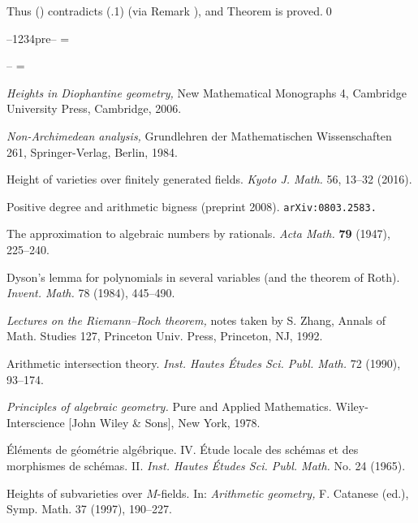 Thus () contradicts (.1) (via Remark ), and Theorem 
is proved.\qed
\enddemo

\Refs

\newdimen\bibindent
{}\hbox{--1234pre--}
\bibindent=

\newdimen\bibitemindent
{}\hbox{--}
\bibitemindent=

 {\it Heights in Diophantine geometry,}
  New Mathematical Monographs 4, Cambridge University Press, Cambridge, 2006.

 {\it Non-Archimedean analysis,}
  Grundlehren der Mathematischen Wissenschaften 261, Springer-Verlag, Berlin,
  1984.

 Height of varieties over finitely generated fields.
  {\it Kyoto J. Math.} 56, 13--32 (2016).

 Positive degree and arithmetic bigness (preprint 2008).
  {\tt arXiv:0803.2583.}

 The approximation to algebraic numbers by rationals.
  {\it Acta Math.} {\bf 79} (1947), 225--240.

  Dyson's lemma for polynomials in several variables (and the theorem of Roth).
  {\it Invent. Math.} 78 (1984), 445--490.

 {\it Lectures on the Riemann--Roch theorem,}
  notes taken by S. Zhang, Annals of Math. Studies 127,
  Princeton Univ. Press, Princeton, NJ, 1992.

 Arithmetic intersection theory.
  {\it Inst. Hautes \'Etudes Sci. Publ. Math.} 72 (1990), 93--174.

 {\it Principles of algebraic geometry.}
  Pure and Applied Mathematics. Wiley-Interscience [John Wiley \& Sons],
  New York, 1978.

 \'El\'ements de g\'eom\'etrie alg\'ebrique. IV.
  \'Etude locale des sch\'emas et des morphismes de sch\'emas. II.
  {\it Inst. Hautes \'Etudes Sci. Publ. Math.} No. 24 (1965).

 Heights of subvarieties over $M$\snug-fields.
  In:  {\it Arithmetic geometry,} F. Catanese (ed.), Symp. Math. 37 (1997),
  190--227.

